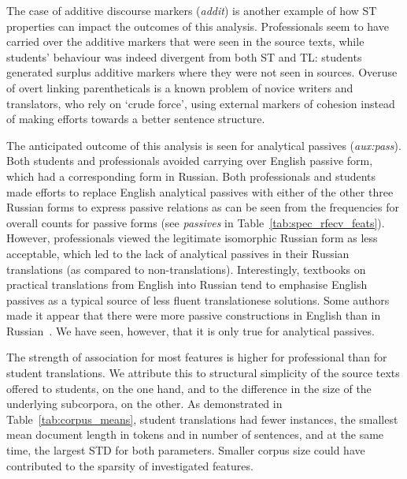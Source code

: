 The case of additive discourse markers (\textit{addit}) is another example of how ST properties can impact the outcomes of this analysis. Professionals seem to have carried over the additive markers that were seen in the source texts, while students' behaviour was indeed divergent from both ST and TL: students generated surplus additive markers where they were not seen in sources. Overuse of overt linking parentheticals is a known problem of novice writers and translators, who rely on `crude force', using external markers of cohesion instead of making efforts towards a better sentence structure.  

The anticipated outcome of this analysis is seen for analytical passives (\textit{aux:pass}). Both students and professionals avoided carrying over English passive form, which had a corresponding form in Russian. Both professionals and students made efforts to replace English analytical passives with either of the other three Russian forms to express passive relations as can be seen from the frequencies for overall counts for passive forms (see \textit{passives} in Table~\ref{tab:spec_rfecv_feats}). However, professionals viewed the legitimate isomorphic Russian form as less acceptable, which led to the lack of analytical passives in their Russian translations (as compared to non-translations). Interestingly, textbooks on practical translations from English into Russian tend to emphasise English passives as a typical source of less fluent translationese solutions. Some authors made it appear that there were more passive constructions in English than in Russian~\cite[see, for example,][]{Zrazhevskaya1972, Belyaev2010, Borisova2019}. We have seen, however, that it is only true for analytical passives.

The strength of association for most features is higher for professional than for student translations. We attribute this to structural simplicity of the source texts offered to students, on the one hand, and to the difference in the size of the underlying subcorpora, on the other. As demonstrated in Table~\ref{tab:corpus_means}, student translations had fewer instances, the smallest mean document length in tokens and in number of sentences, and at the same time, the largest STD for both parameters. Smaller corpus size could have contributed to the sparsity of investigated features.

